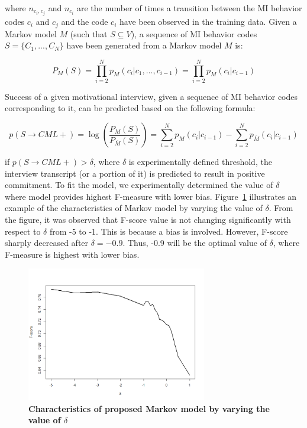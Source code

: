 \documentclass{amia}
\begin{document}
where $n_{c_i,c_j}$ and $n_{c_i}$ are the number of times a transition between the MI behavior codes $c_i$ and $c_j$ and the code $c_i$ have been observed in the training data. Given a Markov model $M$ (such that $S\subseteq V$), a sequence of MI behavior codes $S = \{C_1,...,C_N\}$ have been generated from a Markov model $M$ is:

\begin{equation}
P_M(S) = \prod_{i=2}^N p_M(c_i|c_1,\dots,c_{i-1})=\prod_{i=2}^N p_M(c_i|c_{i-1})
\end{equation}

Success of a given motivational interview, given a sequence of MI behavior codes corresponding to it, can be predicted based on the following formula:

\begin{equation}
p(S\rightarrow CML+) = \log\left(\frac{P_M(S)}{P_{\overline M}(S)}\right)= \sum_{i=2}^N p_M(c_i|c_{i-1})-\sum_{i=2}^N p_{\overline M}(c_i|c_{i-1})
\end{equation}

if $p(S\rightarrow CML+) > \delta $, where $\delta$ is experimentally defined threshold, the interview transcript (or a portion of it) is predicted to result in positive commitment. To fit the model, we experimentally determined the value of $\delta$ where model provides highest F-measure with lower bias. Figure~\ref{fig:delta} illustrates an example of the characteristics of Markov model by varying the value of $\delta$. From the figure, it was observed that F-score value is not changing significantly with respect to $\delta $ from -5 to -1. This is because a bias is involved. However, F-score sharply decreased after $\delta = -0.9$. Thus, -0.9 will be the optimal value of $\delta $, where F-measure is highest with lower bias. 

\begin{figure}[htb!]
    \centering
    \includegraphics[width=0.70\textwidth]{figures/delta.png}
    \caption{\textbf{Characteristics of proposed Markov model by varying the value of $\delta$}}
    \label{fig:delta}
\end{figure}
\end{document}

